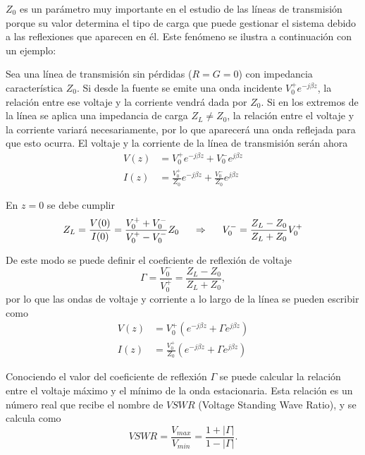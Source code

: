 \documentclass[11pt,a4paper,twoside,pdf]{article}
\numberwithin{equation}{section}
\begin{document}
$Z_0$ es un parámetro muy importante en el estudio de las líneas de transmisión porque su valor determina el tipo de carga que puede gestionar el sistema debido a las reflexiones que aparecen en él. Este fenómeno se ilustra a continuación con un ejemplo:

Sea una línea de transmisión sin pérdidas ($R=G=0$) con impedancia característica $Z_0$. Si desde la fuente se emite una onda incidente $V_0^+e^{-j\beta z}$, la relación entre ese voltaje y la corriente vendrá dada por $Z_0$. Si en los extremos de la línea se aplica una impedancia de carga $Z_L\neq Z_0$, la relación entre el voltaje y la corriente variará necesariamente, por lo que aparecerá una onda reflejada para que esto ocurra. El voltaje y la corriente de la línea de transmisión serán ahora
\begin{equation*}
\begin{split}
    V(z) &= V_0^+e^{-j\beta z} + V_0^-e^{j\beta z}\\[3pt]
    I(z) &= \frac{V_0^+}{Z_0}e^{-j\beta z} + \frac{V_0^-}{Z_0}e^{j\beta z}
\end{split}
\end{equation*}

En $z=0$ se debe cumplir 
\begin{equation}
    Z_L = \frac{V(0)}{I(0)} = \frac{V_0^++V_0^-}{V_0^+-V_0^-}Z_0 \hspace{0.5cm}\Rightarrow\hspace{0.5cm} V_0^- = \frac{Z_L-Z_0}{Z_L+Z_0}V_0^+
\end{equation}

De este modo se puede definir el coeficiente de reflexión de voltaje
\begin{equation}
    \Gamma = \frac{V_0^-}{V_0^+} = \frac{Z_L-Z_0}{Z_L+Z_0},
\end{equation}
\noindent por lo que las ondas de voltaje y corriente a lo largo de la línea se pueden escribir como
\begin{equation}\label{eq:Gamma}
\begin{split}
    V(z) &= V_0^+(e^{-j\beta z} + \Gamma e^{j\beta z})\\
    I(z) &= \frac{V_0^+}{Z_0}(e^{-j\beta z} + \Gamma e^{j\beta z})
\end{split}
\end{equation}

Conociendo el valor del coeficiente de reflexión $\Gamma$ se puede calcular la relación entre el voltaje máximo y el mínimo de la onda estacionaria. Esta relación es un número real que recibe el nombre de $VSWR$ (Voltage Standing Wave Ratio), y se calcula como
\begin{equation}\label{eq:VSWR}
    VSWR = \frac{V_{max}}{V_{min}} = \frac{1+|\Gamma|}{1-|\Gamma|}.
\end{equation}
\end{document}
